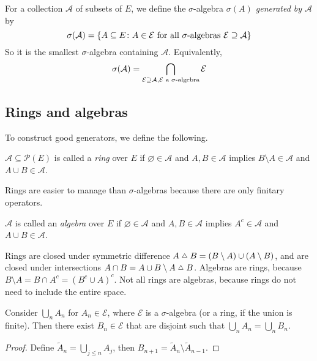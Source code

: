 \begin{definition}
	For a collection \( \mathcal A \) of subsets of \( E \), we define the \( \sigma \)-algebra \emph{\( \sigma(A) \) generated by \( \mathcal A \)} by
	\[ \sigma(\mathcal A) = \qty{A \subseteq E \colon A \in \mathcal E \text{ for all \( \sigma \)-algebras } \mathcal E \supseteq \mathcal A} \]
	So it is the smallest \( \sigma \)-algebra containing \( \mathcal A \).
	Equivalently,
	\[ \sigma(\mathcal A) = \bigcap_{\mathcal E \supseteq \mathcal A, \mathcal E \text{ a \( \sigma \)-algebra}} \mathcal E \]
\end{definition}

\subsection{Rings and algebras}
To construct good generators, we define the following.
\begin{definition}
	\( \mathcal A \subseteq \mathcal P(E) \) is called a \emph{ring} over \( E \) if \( \varnothing \in \mathcal A \) and \( A, B \in \mathcal A \) implies \( B \setminus A \in \mathcal A \) and \( A \cup B \in \mathcal A \).
\end{definition}
Rings are easier to manage than \( \sigma \)-algebras because there are only finitary operators.
\begin{definition}
	\( \mathcal A \) is called an \emph{algebra} over \( E \) if \( \varnothing \in \mathcal A \) and \( A, B \in \mathcal A \) implies \( A^c \in \mathcal A \) and \( A \cup B \in \mathcal A \).
\end{definition}
\begin{remark}
	Rings are closed under symmetric difference \( A \symmdiff B = (B \setminus A) \cup (A \setminus B) \), and are closed under intersections \( A \cap B = A \cup B \setminus A \symmdiff B \).
	Algebras are rings, because \( B \setminus A = B \cap A^c = (B^c \cup A)^c \).
	Not all rings are algebras, because rings do not need to include the entire space.
\end{remark}
\begin{proposition}
	Consider \( \bigcup_n A_n \) for \( A_n \in \mathcal E \), where \( \mathcal E \) is a \( \sigma \)-algebra (or a ring, if the union is finite).
	Then there exist \( B_n \in \mathcal E \) that are disjoint such that \( \bigcup_n A_n = \bigcup_n B_n \).
\end{proposition}
\begin{proof}
	Define \( \widetilde A_n = \bigcup_{j \leq n} A_j \), then \( B_{n+1} = \widetilde A_n \setminus \widetilde A_{n-1} \).
\end{proof}

